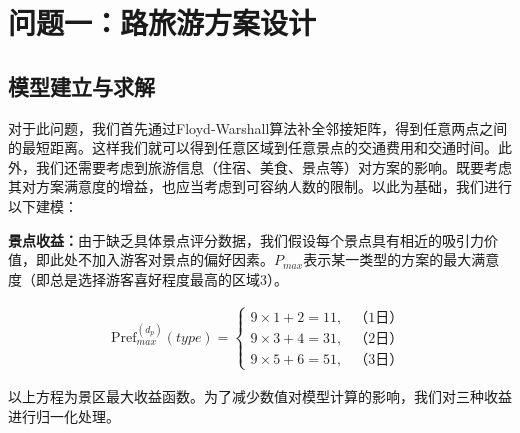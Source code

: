 

\section[\hspace{-2pt}问题一：路旅游方案设计]{{\heiti{} \hspace{-8pt}问题一：路旅游方案设计}}\label{section3: 问题1：路旅游方案设计}

\subsection[\hspace{-2pt}模型建立与求解]{{\heiti{} \hspace{-8pt}模型建立与求解}}\label{section3: 模型建立与求解}

对于此问题，我们首先通过Floyd‑Warshall算法补全邻接矩阵，得到任意两点之间的最短距离。这样我们就可以得到任意区域到任意景点的交通费用和交通时间。此外，我们还需要考虑到旅游信息（住宿、美食、景点等）对方案的影响。既要考虑其对方案满意度的增益，也应当考虑到可容纳人数的限制。\cite{ZNXT201901008}以此为基础，我们进行以下建模：

\textbf{景点收益：}由于缺乏具体景点评分数据，我们假设每个景点具有相近的吸引力价值，即此处不加入游客对景点的偏好因素。$P_{max}$表示某一类型的方案的最大满意度（即总是选择游客喜好程度最高的区域3）。

\begin{equation}
  \begin{aligned}
  \text{Pref}^{(d_{p})}_{max}(type)=\begin{cases}
  9\times 1+2=11, & \text{（1日）}\\
  9\times 3+4=31, & \text{（2日）}\\
  9\times 5+6=51, & \text{（3日）}
  \end{cases}
  \end{aligned}
  \end{equation}

以上方程为景区最大收益函数。为了减少数值对模型计算的影响，我们对三种收益进行归一化处理。

